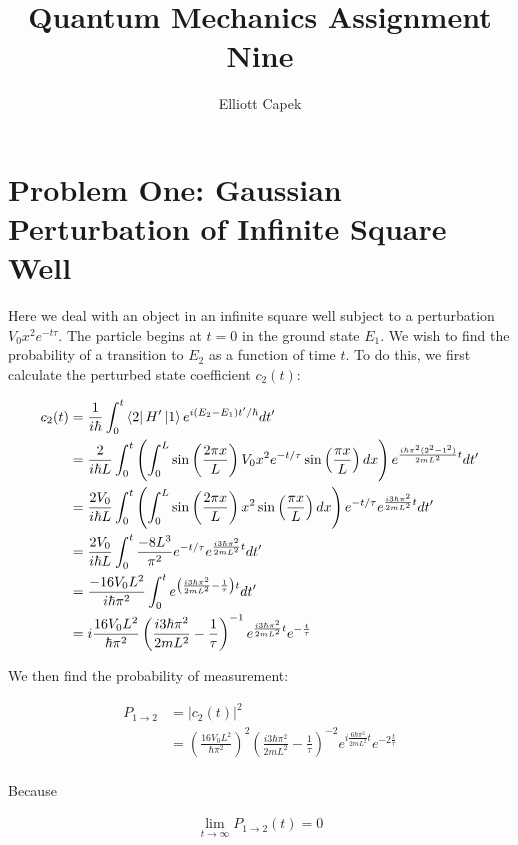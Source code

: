 \documentclass[10pt]{article} %
\title{Quantum Mechanics Assignment Nine}
\author{Elliott Capek}
\begin{document}
\maketitle{}

\section{Problem One: Gaussian Perturbation of Infinite Square Well}
Here we deal with an object in an infinite square well subject to a perturbation $V_0x^2e^{-t\tau}$.
The particle begins at $t=0$ in the ground state $E_1$. We wish to find the probability of a
transition to $E_2$ as a function of time $t$. To do this, we first calculate the perturbed
state coefficient $c_2(t)$:

\begin{align*}
  c_2(t) &= \frac{1}{i\hbar}\int_0^t\bra{2}H'\ket{1}e^{i(E_2-E_1)t'/\hbar}dt'\\
  &= \frac{2}{i\hbar L}\int_0^t
  \left(\int_0^L\sin\left(\frac{2\pi x}{L}\right)
  V_0x^2e^{-t/\tau}\sin\left(\frac{\pi x}{L}\right)dx\right)
  e^{\frac{i\hbar\pi^2(2^2-1^2)}{2mL^2}t}dt'\\
  &= \frac{2V_0}{i\hbar L}\int_0^t
  \left(\int_0^L\sin\left(\frac{2\pi x}{L}\right)
  x^2\sin\left(\frac{\pi x}{L}\right)dx\right)
  e^{-t/\tau}e^{\frac{i3\hbar\pi^2}{2mL^2}t}dt'\\
  &= \frac{2V_0}{i\hbar L}\int_0^t\frac{-8L^3}{\pi^2}e^{-t/\tau}e^{\frac{i3\hbar\pi^2}{2mL^2}t}dt'\\
  &= \frac{-16V_0L^2}{i\hbar\pi^2}
  \int_0^te^{\left(\frac{i3\hbar\pi^2}{2mL^2} - \frac{1}{\tau}\right)t}dt'\\
  &= i\frac{16V_0L^2}{\hbar\pi^2}\left(\frac{i3\hbar\pi^2}{2mL^2} - \frac{1}{\tau}\right)^{-1}
  e^{\frac{i3\hbar\pi^2}{2mL^2}t}e^{-\frac{t}{\tau}}\\
\end{align*}

We then find the probability of measurement:

\begin{align*}
  P_{1\rightarrow2} &= |c_2(t)|^2\\
  &= \left(\frac{16V_0L^2}{\hbar\pi^2}\right)^2
  \left(\frac{i3\hbar\pi^2}{2mL^2} - \frac{1}{\tau}\right)^{-2}
  e^{i\frac{6\hbar\pi^2}{2mL^2}t}e^{-2\frac{t}{\tau}}\\
\end{align*}

Because

\begin{align*}
  \lim_{t\rightarrow\infty} P_{1\rightarrow2}(t) = 0\\
\end{align*}
\end{document}
